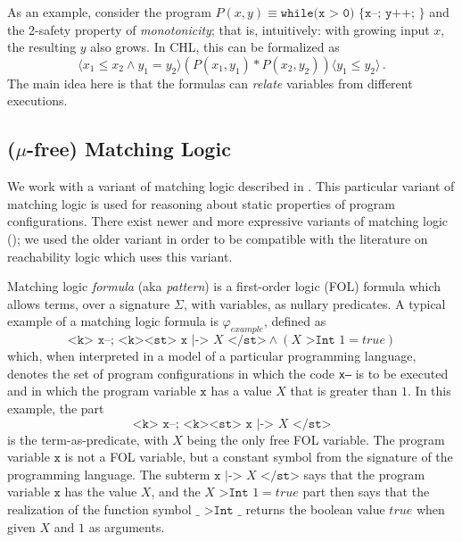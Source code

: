 As an example, consider the program $P(x,y) \equiv \texttt{while(x > 0) \{ x--; y++; \} }$ and the 2-safety property
of \emph{monotonicity}; that is, intuitively: with growing input $x$, the resulting $y$ also grows.
In CHL, this can be formalized as
\begin{equation*}
\langle x_1 \leq x_2 \land y_1 = y_2  \rangle (P(x_1, y_1) * P(x_2, y_2)) \langle y_1 \leq y_2 \rangle \, .
\end{equation*}
The main idea here is that the formulas can \emph{relate} variables from different executions.


\subsection{($\mu$-free) Matching Logic}

We work with a variant of matching logic described in
\cite{StefanescuCMMSR19,RosuSCM13lics}.
This particular variant of matching logic is used for reasoning about static properties of program configurations.
There exist newer and more expressive variants of matching logic (\cite{MmL, MLexplained});
we used the older variant in order to be compatible with the literature on reachability logic which uses this variant.

Matching logic \emph{formula} (aka \emph{pattern}) is a first-order logic (FOL) formula which allows terms,
over a signature $\Sigma$, with variables, as nullary predicates.
A typical example of a matching logic formula is $\varphi_{\mathit{example}}$, defined as
\begin{equation}\label{eqn:exampleMLPattern}
\texttt{<k> x--; <k><st> x} \texttt{ |-> } X\texttt{ </st>} \land (X \texttt{ >Int } 1 = \mathit{true})
\end{equation}
which, when interpreted in a model of a particular programming language,
denotes the set of program configurations in which the code \texttt{x--} is to be executed
and in which the program variable $\texttt{x}$ has a value $X$ that is greater than $1$.
In this example, the part
\begin{equation*}
    \texttt{<k> x--; <k><st> x} \texttt{ |-> } X\texttt{ </st>}
\end{equation*}
is the term-as-predicate, with $X$ being the only free FOL variable.
The program variable $\texttt{x}$ is not a FOL variable, but a constant symbol from the signature of the programming language.
The subterm $\texttt{x} \texttt{ |-> } X\texttt{ </st>}$ says that the program variable $\texttt{x}$
has the value $X$, and the $X \texttt{ >Int } 1 = \mathit{true}$ part then says that the realization
of the function symbol $\_ \texttt{ >Int } \_$ returns the boolean value $\mathit{true}$ when given $X$ and $1$
as arguments.

